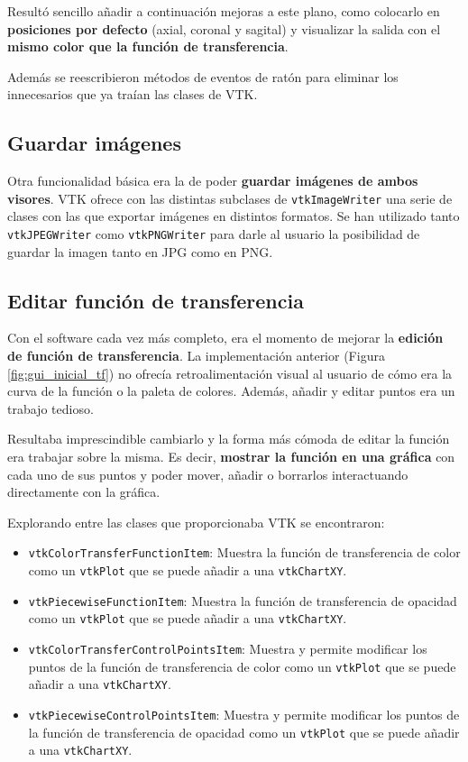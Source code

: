Resultó sencillo añadir a continuación mejoras a este plano, como colocarlo en \textbf{posiciones por defecto} (axial, coronal y sagital) y visualizar la salida con el \textbf{mismo color que la función de transferencia}.

Además se reescribieron métodos de eventos de ratón para eliminar los innecesarios que ya traían las clases de VTK.

\subsection{Guardar imágenes}

Otra funcionalidad básica era la de poder \textbf{guardar imágenes de ambos visores}. VTK ofrece con las distintas subclases de \texttt{vtkImageWriter} una serie de clases con las que exportar imágenes en distintos formatos. Se han utilizado tanto \texttt{vtkJPEGWriter} como \texttt{vtkPNGWriter} para darle al usuario la posibilidad de guardar la imagen tanto en JPG como en PNG. 

\subsection{Editar función de transferencia}

Con el software cada vez más completo, era el momento de mejorar la \textbf{edición de función de transferencia}. La implementación anterior (Figura \ref{fig:gui_inicial_tf}) no ofrecía retroalimentación visual al usuario de cómo era la curva de la función o la paleta de colores. Además, añadir y editar puntos era un trabajo tedioso.

Resultaba imprescindible cambiarlo y la forma más cómoda de editar la función era trabajar sobre la misma. Es decir, \textbf{mostrar la función en una gráfica} con cada uno de sus puntos y poder mover, añadir o borrarlos interactuando directamente con la gráfica.

Explorando entre las clases que proporcionaba VTK se encontraron:

\begin{itemize}
	\item \texttt{vtkColorTransferFunctionItem}: Muestra la función de transferencia de color como un \texttt{vtkPlot} que se puede añadir a una \texttt{vtkChartXY}.
	\item \texttt{vtkPiecewiseFunctionItem}: Muestra la función de transferencia de opacidad como un \texttt{vtkPlot} que se puede añadir a una \texttt{vtkChartXY}.
	\item \texttt{vtkColorTransferControlPointsItem}: Muestra y permite modificar los puntos de la función de transferencia de color como un \texttt{vtkPlot} que se puede añadir a una \texttt{vtkChartXY}.
	\item \texttt{vtkPiecewiseControlPointsItem}: Muestra y permite modificar los puntos de la función de transferencia de opacidad como un \texttt{vtkPlot} que se puede añadir a una \texttt{vtkChartXY}.
\end{itemize}

